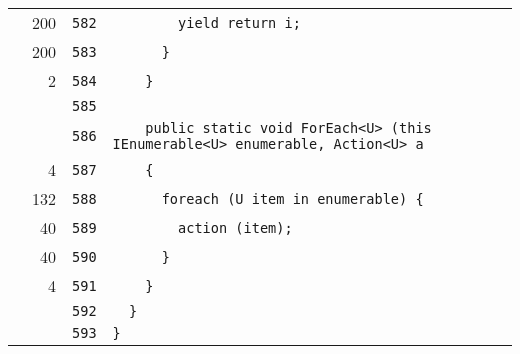 \documentclass[a4paper,10pt]{article}
\begin{document}
\begin{longtable}[l]{lrrl}
\cellcolor{green} & 200 & \verb~582~ & \verb~        yield return i;~\\
\cellcolor{green} & 200 & \verb~583~ & \verb~      }~\\
\cellcolor{green} & 2 & \verb~584~ & \verb~    }~\\
\cellcolor{gray} &  & \verb~585~ & \verb~~\\
\cellcolor{gray} &  & \verb~586~ & \verb~    public static void ForEach<U> (this IEnumerable<U> enumerable, Action<U> a~\\
\cellcolor{green} & 4 & \verb~587~ & \verb~    {~\\
\cellcolor{green} & 132 & \verb~588~ & \verb~      foreach (U item in enumerable) {~\\
\cellcolor{green} & 40 & \verb~589~ & \verb~        action (item);~\\
\cellcolor{green} & 40 & \verb~590~ & \verb~      }~\\
\cellcolor{green} & 4 & \verb~591~ & \verb~    }~\\
\cellcolor{gray} &  & \verb~592~ & \verb~  }~\\
\cellcolor{gray} &  & \verb~593~ & \verb~}~\\
\end{longtable}
\end{document}

